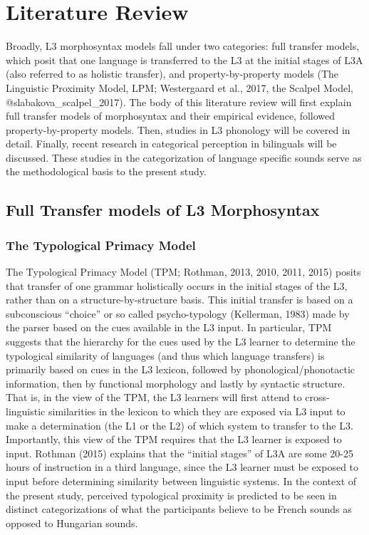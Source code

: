 \documentclass[
  english,
  man]{apa6}
\begin{document}
\hypertarget{literature-review}{%
\section{Literature Review}\label{literature-review}}

Broadly, L3 morphosyntax models fall under two categories: full transfer models, which posit that one language is transferred to the L3 at the initial stages of L3A (also referred to as holistic transfer), and property-by-property models (The Linguistic Proximity Model, LPM; Westergaard et al., 2017, the Scalpel Model, @slabakova\_scalpel\_2017). The body of this literature review will first explain full transfer models of morphosyntax and their empirical evidence, followed property-by-property models.
Then, studies in L3 phonology will be covered in detail.
Finally, recent research in categorical perception in bilinguals will be discussed. These studies in the categorization of language specific sounds serve as the methodological basis to the present study.

\hypertarget{full-transfer-models-of-l3-morphosyntax}{%
\subsection{Full Transfer models of L3 Morphosyntax}\label{full-transfer-models-of-l3-morphosyntax}}

\hypertarget{the-typological-primacy-model}{%
\subsubsection{The Typological Primacy Model}\label{the-typological-primacy-model}}

The Typological Primacy Model (TPM; Rothman, 2013, 2010, 2011, 2015) posits that transfer of one grammar holistically occurs in the initial stages of the L3, rather than on a structure-by-structure basis.
This initial transfer is based on a subconscious \enquote{choice} or so called psycho-typology (Kellerman, 1983) made by the parser based on the cues available in the L3 input.
In particular, TPM suggests that the hierarchy for the cues used by the L3 learner to determine the typological similarity of languages (and thus which language transfers) is primarily based on cues in the L3 lexicon, followed by phonological/phonotactic information, then by functional morphology and lastly by syntactic structure.
That is, in the view of the TPM, the L3 learners will first attend to cross-linguistic similarities in the lexicon to which they are exposed via L3 input to make a determination (the L1 or the L2) of which system to transfer to the L3.
Importantly, this view of the TPM requires that the L3 learner is exposed to input.
Rothman (2015) explains that the \enquote{initial stages} of L3A are some 20-25 hours of instruction in a third language, since the L3 learner must be exposed to input before determining similarity between linguistic systems.
In the context of the present study, perceived typological proximity is predicted to be seen in distinct categorizations of what the participants believe to be French sounds as opposed to Hungarian sounds.
\end{document}
